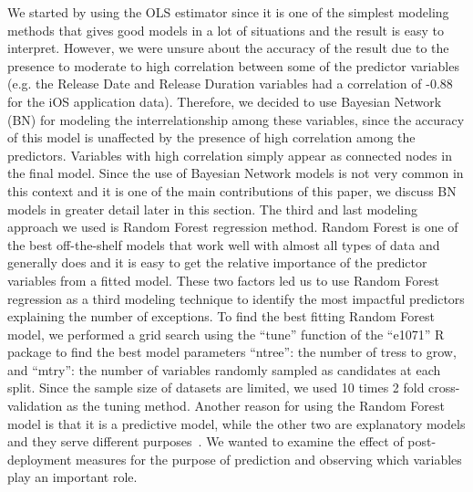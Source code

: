 \documentclass[smallcondensed]{svjour3}     %
\begin{document}
We started by using the OLS estimator since it is one of the simplest modeling methods that gives good models in a lot of situations and the result is easy to interpret. However, we were unsure about the accuracy of the result due to the presence to moderate to high correlation between some of the predictor variables (e.g. the Release Date and Release Duration variables had a correlation of -0.88 for the iOS application data). 
Therefore, we decided to use Bayesian Network (BN) for modeling the interrelationship among these variables, since the accuracy of this model is unaffected by the presence of high correlation among the predictors. Variables with high correlation simply appear as connected nodes in the final model. Since the use of Bayesian Network models is not very common in this context and it is one of the main contributions of this paper, we discuss BN models in greater detail later in this section. The third and last modeling approach we used is Random Forest regression method. Random Forest is one of the best off-the-shelf models that work well with almost all types of data and generally does  and it is easy to get the relative importance of the predictor variables from a fitted model. These two factors led us to use Random Forest regression as a third modeling technique to identify the most impactful predictors explaining the number of exceptions. To find the best fitting Random Forest model, we performed a grid search using the ``tune'' function of the ``e1071'' R package to find the best model parameters ``ntree'': the number of tress to grow, and ``mtry'': the number of variables randomly sampled as candidates at each split. Since the sample size of datasets are limited, we used 10 times 2 fold cross-validation as the tuning method. Another reason for using  the Random Forest model is that it is a predictive model, while the other two are explanatory models and they serve different purposes~\cite{shmueli2010explain}. We wanted to examine the effect of post-deployment measures for the purpose of prediction and observing which variables play an important role. 
\end{document}
